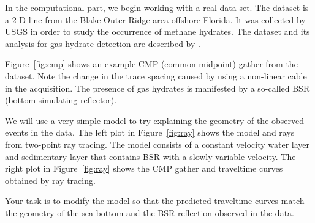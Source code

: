 
In the computational part, we begin working with a real data
set. The dataset is a 2-D line from the Blake Outer Ridge area
offshore Florida. It was collected by USGS in order to study the
occurrence of methane hydrates. The dataset and its analysis for gas
hydrate detection are described by
\cite{GEO63-05-16591669,GEO65-02-05650573}.

Figure~\ref{fig:cmp} shows an example CMP (common midpoint) gather
from the dataset. Note the change in the trace spacing caused by using
a non-linear cable in the acquisition. The presence of gas hydrates is
manifested by a so-called BSR (bottom-simulating reflector).


We will use a very simple model to try explaining the geometry of the
observed events in the data. The left plot in Figure~\ref{fig:ray}
shows the model and rays from two-point ray tracing. The model
consists of a constant velocity water layer and sedimentary layer that
contains BSR with a slowly variable velocity. The right plot in
Figure~\ref{fig:ray} shows the CMP gather and traveltime curves
obtained by ray tracing. 


Your task is to modify the model so that the predicted traveltime
curves match the geometry of the sea bottom and the BSR reflection
observed in the data.

